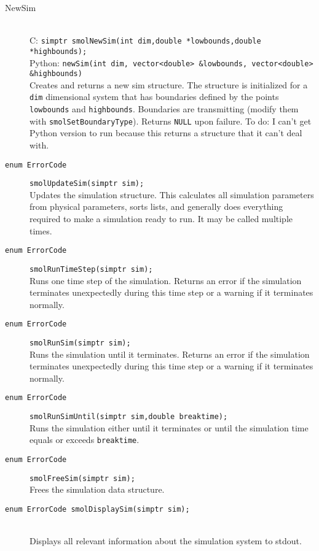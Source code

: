 \documentclass {book}
\begin{document}
\begin{description}

\item[NewSim]
\hfill \\
C: \texttt{simptr smolNewSim(int dim,double *lowbounds,double *highbounds);}\\
Python: \texttt{newSim(int dim, vector<double> \&lowbounds, vector<double> \&highbounds)}\\
Creates and returns a new sim structure. The structure is initialized for a \texttt{dim} dimensional system that has boundaries defined by the points \texttt{lowbounds} and \texttt{highbounds}. Boundaries are transmitting (modify them with \texttt{smolSetBoundaryType}). Returns \texttt{NULL} upon failure. To do: I can't get Python version to run because this returns a structure that it can't deal with.

\item[\texttt{enum ErrorCode}]
\texttt{smolUpdateSim(simptr sim);}
\hfill \\
Updates the simulation structure. This calculates all simulation parameters from physical parameters, sorts lists, and generally does everything required to make a simulation ready to run. It may be called multiple times.

\item[\texttt{enum ErrorCode}]
\texttt{smolRunTimeStep(simptr sim);}
\hfill \\
Runs one time step of the simulation. Returns an error if the simulation terminates unexpectedly during this time step or a warning if it terminates normally.

\item[\texttt{enum ErrorCode}]
\texttt{smolRunSim(simptr sim);}
\hfill \\
Runs the simulation until it terminates. Returns an error if the simulation terminates unexpectedly during this time step or a warning if it terminates normally.

\item[\texttt{enum ErrorCode}]
\texttt{smolRunSimUntil(simptr sim,double breaktime);}
\hfill \\
Runs the simulation either until it terminates or until the simulation time equals or exceeds \texttt{breaktime}.

\item[\texttt{enum ErrorCode}]
\texttt{smolFreeSim(simptr sim);}
\hfill \\
Frees the simulation data structure.

\item[\texttt{enum ErrorCode smolDisplaySim(simptr sim);}]
\hfill \\
Displays all relevant information about the simulation system to stdout.

\end{description}
\end{document}
